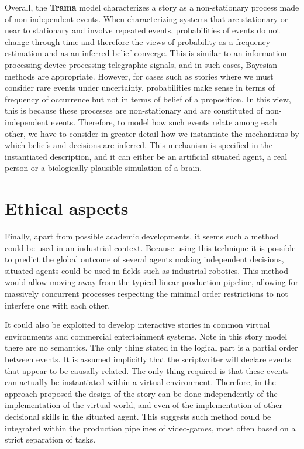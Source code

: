 \documentclass[
		twoside,openright,titlepage,numbers=noenddot,manychapters,
		headinclude,%
                footinclude=false,cleardoublepage=empty,
                BCOR=5mm,
		fontsize=11pt, %
                 enabledeprecatedfontcommands]{scrreprt}
\begin{document}
Overall, the \textbf{Trama} model characterizes a story as a non-stationary process made of non-independent events. When characterizing systems that are stationary or near to stationary and involve repeated events, probabilities of events do not change through time and therefore the views of probability as a frequency estimation and as an inferred belief converge. This is similar to an information-processing device processing telegraphic signals, and in such cases, Bayesian methods are appropriate. However, for cases such as stories where we must consider rare events under uncertainty, probabilities make sense in terms of frequency of occurrence but not in terms of belief of a proposition. In this view, this is because these processes are non-stationary and are constituted of non-independent events. Therefore, to model how such events relate among each other, we have to consider in greater detail how we instantiate the mechanisms by which beliefs and decisions are inferred. This mechanism is specified in the instantiated description, and it can either be an artificial situated agent, a real person or a biologically plausible simulation of a brain.





\section{Ethical aspects}


Finally, apart from possible academic developments, it seems such a method could be used in an industrial context. Because using this technique it is possible to predict the global outcome of several agents making independent decisions, situated agents could be used in fields such as industrial robotics. This method would allow moving away from the typical linear production pipeline, allowing for massively concurrent processes respecting the minimal order restrictions to not interfere one with each other.  

It could also be exploited to develop interactive stories in common virtual environments and commercial entertainment systems. Note in this story model there are no semantics. The only thing stated in the logical part is a partial order between events. It is assumed implicitly that the scriptwriter will declare events that appear to be causally related. The only thing required is that these events can actually be instantiated within a virtual environment. Therefore, in the approach proposed the design of the story can be done independently of the implementation of the virtual world, and even of the implementation of other decisional skills in the situated agent. This suggests such method could be integrated within the production pipelines of video-games, most often based on a strict separation of tasks. 
\end{document}
